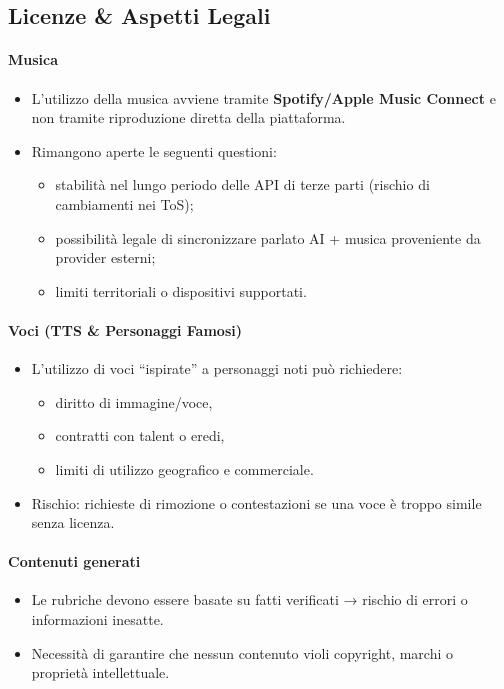 \documentclass[11pt,a4paper]{article}
\begin{document}

\subsection{Licenze \& Aspetti Legali}

\paragraph{Musica}
\begin{itemize}
    \item L’utilizzo della musica avviene tramite \textbf{Spotify/Apple Music Connect} e non tramite riproduzione diretta della piattaforma.
    \item Rimangono aperte le seguenti questioni:
    \begin{itemize}
        \item stabilità nel lungo periodo delle API di terze parti (rischio di cambiamenti nei ToS);
        \item possibilità legale di sincronizzare parlato AI + musica proveniente da provider esterni;
        \item limiti territoriali o dispositivi supportati.
    \end{itemize}
\end{itemize}

\paragraph{Voci (TTS \& Personaggi Famosi)}
\begin{itemize}
    \item L’utilizzo di voci “ispirate” a personaggi noti può richiedere:
    \begin{itemize}
        \item diritto di immagine/voce,
        \item contratti con talent o eredi,
        \item limiti di utilizzo geografico e commerciale.
    \end{itemize}
    \item Rischio: richieste di rimozione o contestazioni se una voce è troppo simile senza licenza.
\end{itemize}

\paragraph{Contenuti generati}
\begin{itemize}
    \item Le rubriche devono essere basate su fatti verificati → rischio di errori o informazioni inesatte.
    \item Necessità di garantire che nessun contenuto violi copyright, marchi o proprietà intellettuale.
\end{itemize}
\end{document}
